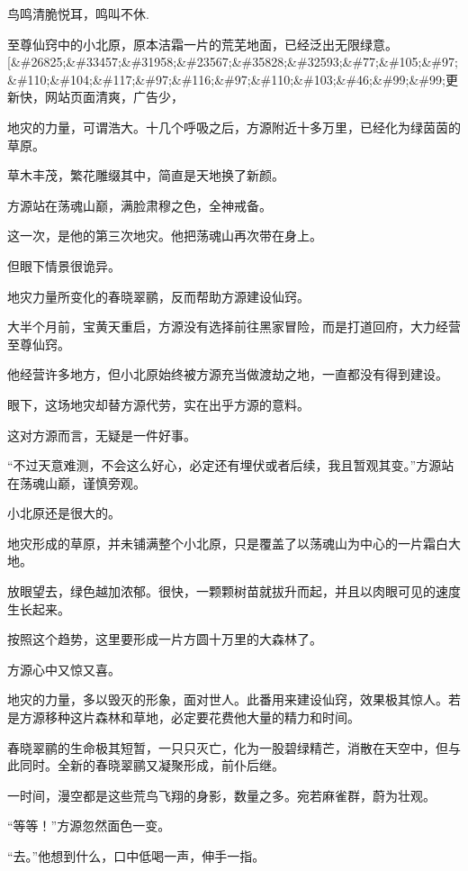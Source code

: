 
\begin{this_body}

鸟鸣清脆悦耳，鸣叫不休.

至尊仙窍中的小北原，原本洁霜一片的荒芜地面，已经泛出无限绿意。[\&\#26825;\&\#33457;\&\#31958;\&\#23567;\&\#35828;\&\#32593;\&\#77;\&\#105;\&\#97;\&\#110;\&\#104;\&\#117;\&\#97;\&\#116;\&\#97;\&\#110;\&\#103;\&\#46;\&\#99;\&\#99;更新快，网站页面清爽，广告少，

地灾的力量，可谓浩大。十几个呼吸之后，方源附近十多万里，已经化为绿茵茵的草原。

草木丰茂，繁花雕缀其中，简直是天地换了新颜。

方源站在荡魂山巅，满脸肃穆之色，全神戒备。

这一次，是他的第三次地灾。他把荡魂山再次带在身上。

但眼下情景很诡异。

地灾力量所变化的春晓翠鹂，反而帮助方源建设仙窍。

大半个月前，宝黄天重启，方源没有选择前往黑家冒险，而是打道回府，大力经营至尊仙窍。

他经营许多地方，但小北原始终被方源充当做渡劫之地，一直都没有得到建设。

眼下，这场地灾却替方源代劳，实在出乎方源的意料。

这对方源而言，无疑是一件好事。

“不过天意难测，不会这么好心，必定还有埋伏或者后续，我且暂观其变。”方源站在荡魂山巅，谨慎旁观。

小北原还是很大的。

地灾形成的草原，并未铺满整个小北原，只是覆盖了以荡魂山为中心的一片霜白大地。

放眼望去，绿色越加浓郁。很快，一颗颗树苗就拔升而起，并且以肉眼可见的速度生长起来。

按照这个趋势，这里要形成一片方圆十万里的大森林了。

方源心中又惊又喜。

地灾的力量，多以毁灭的形象，面对世人。此番用来建设仙窍，效果极其惊人。若是方源移种这片森林和草地，必定要花费他大量的精力和时间。

春晓翠鹂的生命极其短暂，一只只灭亡，化为一股碧绿精芒，消散在天空中，但与此同时。全新的春晓翠鹂又凝聚形成，前仆后继。

一时间，漫空都是这些荒鸟飞翔的身影，数量之多。宛若麻雀群，蔚为壮观。

“等等！”方源忽然面色一变。

“去。”他想到什么，口中低喝一声，伸手一指。


\end{this_body}
